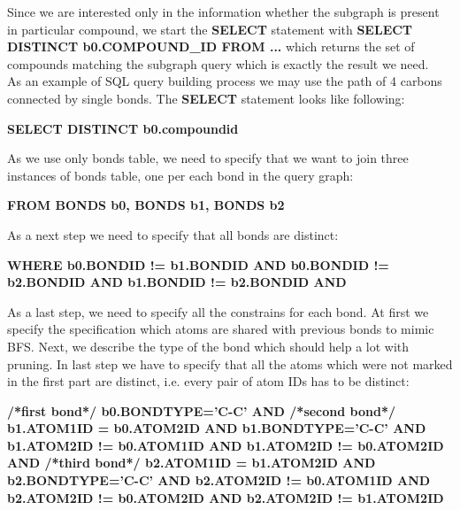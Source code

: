 {Since we are interested only in the information whether the subgraph is present in particular compound, we start the \textbf{SELECT} statement with \textbf{SELECT DISTINCT b0.COMPOUND\_ID FROM ...} which returns the set of compounds matching the subgraph query which is exactly the result we need.\\

As an example of SQL query building process we may use the path of 4 carbons connected by single bonds. The \textbf{SELECT} statement looks like following:

\begin{center}
	\textbf{SELECT DISTINCT b0.compound\textunderscore id}
\end{center}

As we use only bonds table, we need to specify that we want to join three instances of bonds table, one per each bond in the query graph:

\begin{center}
	\textbf{FROM BONDS b0, BONDS b1, BONDS b2}
\end{center}

As a next step we need to specify that all bonds are distinct:

\begin{center}
	\textbf{WHERE b0.BOND\textunderscore ID != b1.BOND\textunderscore ID AND \linebreak b0.BOND\textunderscore ID != b2.BOND\textunderscore ID AND \linebreak b1.BOND\textunderscore ID != b2.BOND\textunderscore ID AND}
\end{center}

As a last step, we need to specify all the constrains for each bond. At first we specify the specification which atoms are shared with previous bonds to mimic BFS. Next, we describe the type of the bond which should help a lot with pruning. In last step we have to specify that all the atoms which were not marked in the first part are distinct, i.e. every pair of atom IDs has to be distinct:

\begin{center}
	\textbf{/*first bond*/ \linebreak b0.BONDTYPE='C-C' AND \linebreak /*second bond*/ \linebreak b1.ATOM1\textunderscore ID = b0.ATOM2\textunderscore ID AND b1.BONDTYPE='C-C' AND \linebreak b1.ATOM2\textunderscore ID != b0.ATOM1\textunderscore ID AND \linebreak b1.ATOM2\textunderscore ID != b0.ATOM2\textunderscore ID AND \linebreak /*third bond*/ \linebreak b2.ATOM1\textunderscore ID = b1.ATOM2\textunderscore ID AND b2.BONDTYPE='C-C' AND \linebreak b2.ATOM2\textunderscore ID != b0.ATOM1\textunderscore ID AND \linebreak b2.ATOM2\textunderscore ID != b0.ATOM2\textunderscore ID AND \linebreak b2.ATOM2\textunderscore ID != b1.ATOM2\textunderscore ID }
\end{center}


}
